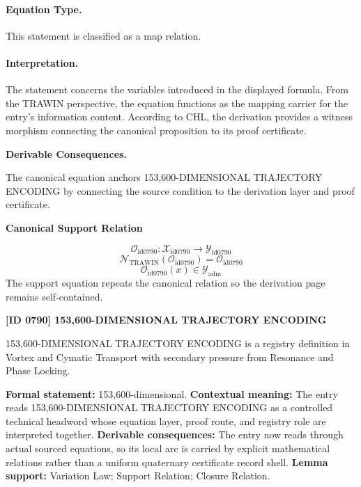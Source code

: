 \paragraph{Equation Type.}
This statement is classified as a map relation.

\paragraph{Interpretation.}
The statement concerns the variables introduced in the displayed formula. From the TRAWIN perspective, the equation functions as the mapping carrier for the entry’s information content. According to CHL, the derivation provides a witness morphism connecting the canonical proposition to its proof certificate.

\par\vspace{0.35em}
\noindent\textbf{Derivable Consequences.}\quad
\begingroup
\footnotesize
\raggedright
The canonical equation anchors 153,600-DIMENSIONAL TRAJECTORY ENCODING by connecting the source condition to the derivation layer and proof certificate.
\par\endgroup

\noindent\textbf{Canonical Support Relation}\par
\[
\mathcal{O}_{\mathrm{id0790}}:\mathcal{X}_{\mathrm{id0790}}\longrightarrow\mathcal{Y}_{\mathrm{id0790}}
\]
\[
\mathcal{N}_{\mathrm{TRAWIN}}(\mathcal{O}_{\mathrm{id0790}})=\mathcal{O}_{\mathrm{id0790}}
\]
\[
\mathcal{O}_{\mathrm{id0790}}(x)\in\mathcal{Y}_{\mathrm{adm}}
\]
\noindent The support equation repeats the canonical relation so the derivation page remains self-contained.\par

\clearpage
\noindent\textbf{[ID 0790] 153,600-DIMENSIONAL TRAJECTORY ENCODING}\par
\vspace{0.35em}
\begingroup\small
{}
153,600-DIMENSIONAL TRAJECTORY ENCODING is a registry definition in Vortex and Cymatic Transport with secondary pressure from Resonance and Phase Locking.

\begingroup\footnotesize\setlength{\emergencystretch}{3em}\sloppy
\textbf{Formal statement:} 153,600-dimensional. \textbf{Contextual meaning:} The entry reads 153,600-DIMENSIONAL TRAJECTORY ENCODING as a controlled technical headword whose equation layer, proof route, and registry role are interpreted together. \textbf{Derivable consequences:} The entry now reads through actual sourced equations, so its local arc is carried by explicit mathematical relations rather than a uniform quaternary certificate record shell. \textbf{Lemma support:} Variation Law; Support Relation; Closure Relation.\par
\endgroup

